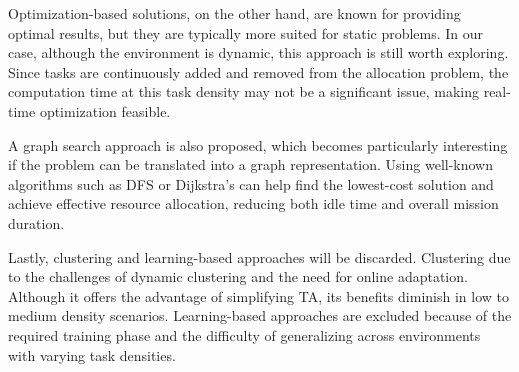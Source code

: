 Optimization-based solutions, on the other hand, are known for providing optimal results, but they are typically more suited for static problems. In our case, although the environment is dynamic, this approach is still worth exploring. Since tasks are continuously added and removed from the allocation problem, the computation time at this task density may not be a significant issue, making real-time optimization feasible.

A graph search approach is also proposed, which becomes particularly interesting if the problem can be translated into a graph representation. Using well-known algorithms such as \ac{DFS} \cite{Tarjan1972} or Dijkstra's \cite{Dijkstra1959} can help find the lowest-cost solution and achieve effective resource allocation, reducing both idle time and overall mission duration.

Lastly, clustering and learning-based approaches will be discarded. Clustering due to the challenges of dynamic clustering and the need for online adaptation. Although it offers the advantage of simplifying \ac{TA}, its benefits diminish in low to medium density scenarios. Learning-based approaches are excluded because of the required training phase and the difficulty of generalizing across environments with varying task densities.